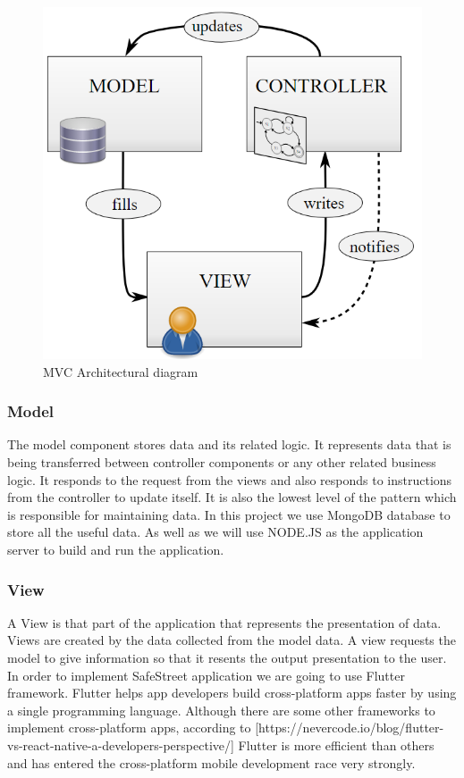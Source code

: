 \begin{figure}
\centering
\includegraphics[width=\textwidth]{Images/MVC.png}
\caption{\label{fig:MVC} MVC Architectural diagram}
\end{figure}

\subsubsection{Model}
The model component stores data and its related logic. It represents data that is being transferred between controller components or any other related business logic. It responds to the request from the views and also responds to instructions from the controller to update itself. It is also the lowest level of the pattern which is responsible for maintaining data. In this project we use MongoDB database to store all the useful data. As well as we will use NODE.JS as the application server to build and run the application.

\subsubsection{View}
A View is that part of the application that represents the presentation of data.
Views are created by the data collected from the model data. A view requests the model to give information so that it resents the output presentation to the user.
In order to implement SafeStreet application we are going to use Flutter framework. Flutter helps app developers build cross-platform apps faster by using a single programming language. Although there are some other frameworks to implement cross-platform apps, according to [https://nevercode.io/blog/flutter-vs-react-native-a-developers-perspective/] Flutter is more efficient than others and has entered the cross-platform mobile development race very strongly.

